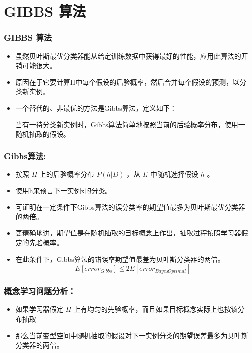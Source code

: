 \documentclass{beamer}
\begin{document}
\section{GIBBS 算法}
\label{sec-7}
\begin{frame}
\frametitle{GIBBS 算法}
\label{sec-7-1}

\begin{itemize}
\item 虽然贝叶斯最优分类器能从给定训练数据中获得最好的性能，应用此算法的开销可能很大。
\item 原因在于它要计算H中每个假设的后验概率，然后合并每个假设的预测，以分类新实例。
\item 一个替代的、非最优的方法是Gibbs算法，定义如下：
 
  当有一待分类新实例时，Gibbs算法简单地按照当前的后验概率分布，使用一随机抽取的假设。
\end{itemize}
\end{frame}
\begin{frame}
\frametitle{Gibbs算法:}
\label{sec-7-2}


\begin{itemize}
\item 按照 $H$ 上的后验概率分布 $P(h|D)$ ，从 $H$ 中随机选择假设 $h$ 。
\item 使用h来预言下一实例x的分类。
\item 可证明在一定条件下Gibbs算法的误分类率的期望值最多为贝叶斯最优分类器的两倍。
\item 更精确地讲，期望值是在随机抽取的目标概念上作出，抽取过程按照学习器假定的先验概率。
\item 在此条件下，Gibbs算法的错误率期望值最差为贝叶斯分类器的两倍。
   \[ E[error_{Gibbs}] \leq 2 E[error_{Bayes Optimal}] \]
\end{itemize}
\end{frame}
\begin{frame}
\frametitle{概念学习问题分析：}
\label{sec-7-3}

\begin{itemize}
\item 如果学习器假定 $H$ 上有均匀的先验概率，而且如果目标概念实际上也按该分布抽取
\item 那么当前变型空间中随机抽取的假设对下一实例分类的期望误差最多为贝叶斯分类器的两倍。
\end{itemize}
\end{frame}
\end{document}
